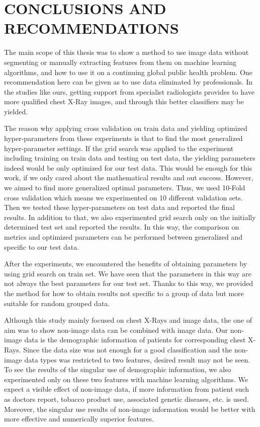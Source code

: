 \chapter{CONCLUSIONS AND RECOMMENDATIONS}\label{ch:CH7}

The main scope of this thesis was to show a method to use image data without segmenting or manually extracting features from them on machine learning algorithms, and how to use it on a continuing global public health problem. One recommendation here can be given as to use data eliminated by professionals. In the studies like ours, getting support from specialist radiologists provides to have more qualified chest X-Ray images, and through this better classifiers may be yielded. 

The reason why applying cross validation on train data and yielding optimized hyper-parameters from these experiments is that to find the most generalized hyper-parameter settings. If the grid search was applied to the experiment including training on train data and testing on test data, the yielding parameters indeed would be only optimized for our test data. This would be enough for this work, if we only cared about the mathematical results and out success. However, we aimed to find more generalized optimal parameters. Thus, we used 10-Fold cross validation which means we experimented on 10 different validation sets. Then we tested these hyper-parameters on test data and reported the final results. In addition to that, we also experimented grid search only on the initially determined test set and reported the results. In this way, the comparison on metrics and optimized parameters can be performed between generalized and specific to our test data.

After the experiments, we encountered the benefits of obtaining parameters by using grid search on train set. We have seen that the parameters in this way are not always the best parameters for our test set. Thanks to this way, we provided the method for how to obtain results not specific to a group of data but more suitable for random grouped data.

Although this study mainly focused on chest X-Rays and image data, the one of aim was to show non-image data can be combined with image data. Our non-image data is the demographic information of patients for corresponding chest X-Rays. Since the data size was not enough for a good classification and the non-image data types was restricted to two features, desired result may not be seen. To see the results of the singular use of demographic information, we also experimented only on these two features with machine learning algorithms. We expect a visible effect of non-image data, if more information from patient such as doctors report, tobacco product use, associated genetic diseases, etc. is used. Moreover, the singular use results of non-image information would be better with more effective and numerically superior features.

